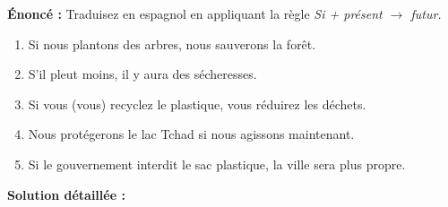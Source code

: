 \documentclass[11pt]{article}
\newcommand{\esp}[1]{\ifmmode\text{\textit{#1}}\else\begingroup\selectlanguage{spanish}\itshape #1\endgroup\fi}
\begin{document}
\begin{exoresolu}
\textbf{Énoncé :} Traduisez en espagnol en appliquant la règle \esp{Si} + présent $\rightarrow$ futur.
\begin{enumerate}
    \item Si nous plantons des arbres, nous sauverons la forêt.
    \item S'il pleut moins, il y aura des sécheresses.
    \item Si vous (vous) recyclez le plastique, vous réduirez les déchets.
    \item Nous protégerons le lac Tchad si nous agissons maintenant.
    \item Si le gouvernement interdit le sac plastique, la ville sera plus propre.
\end{enumerate}

\tcblower
\textbf{Solution détaillée :}


\end{exoresolu}
\end{document}
